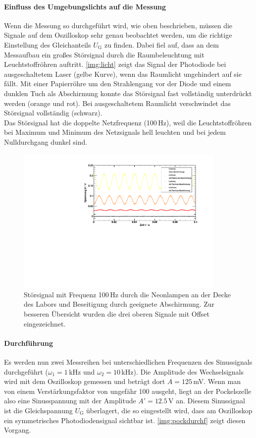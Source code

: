 \paragraph{Einfluss des Umgebungslichts auf die Messung}
Wenn die Messung so durchgeführt wird, wie oben beschrieben,
müssen die Signale auf dem Oszilloskop sehr genau beobachtet werden,
um die richtige Einstellung des Gleichanteils $U_{\text{G}}$ zu finden.
Dabei fiel auf, dass an dem Messaufbau ein großes Störsignal durch die Raumbeleuchtung
mit Leuchtstoffröhren auftritt.
\autoref{img:licht} zeigt das Signal der Photodiode bei ausgeschaltetem Laser (gelbe Kurve),
wenn das Raumlicht ungehindert auf sie fällt.
Mit einer Papierröhre um den Strahlengang vor der Diode und einem
dunklen Tuch als Abschirmung konnte das Störsignal fast vollständig unterdrückt werden (orange und rot).
Bei ausgeschaltetem Raumlicht verschwindet das Störsignal vollständig (schwarz).\\
Das Störsignal hat die doppelte Netzfrequenz (100\,Hz), weil die Leuchtstoffröhren bei Maximum und
Minimum des Netzsignals hell leuchten und bei jedem Nulldurchgang dunkel sind.

\begin{figure}[H]
\begin{center}
  \includegraphics[width=0.9\textwidth]{../img/licht.pdf}
  \caption{Störsignal mit Frequenz 100\,Hz durch die Neonlampen an der Decke des Labors und
  Beseitigung durch geeignete Abschirmung.
  Zur besseren Übersicht wurden die drei oberen Signale mit Offset eingezeichnet. }
  \label{img:licht}
\end{center}
\end{figure}


\paragraph{Durchführung}
Es werden nun zwei Messreihen bei unterschiedlichen Frequenzen des Sinussignals durchgeführt
($\omega_1=1$\,kHz und $\omega_2=10$\,kHz).
Die Amplitude des Wechselsignals wird mit dem Oszilloskop gemessen und beträgt dort
$A=125$\,mV. Wenn man von einem Verstärkungsfaktor von ungefähr 100 ausgeht,
liegt an der Pockelszelle also eine Sinusspannung mit der Amplitude $A'=12.5$\,V an.
Diesem Sinussignal ist die Gleichspannung $U_{\text{G}}$ überlagert,
die so eingestellt wird, dass am Oszilloskop ein symmetrisches Photodiodensignal sichtbar ist.
\autoref{img:pockdurchf} zeigt diesen Vorgang.

